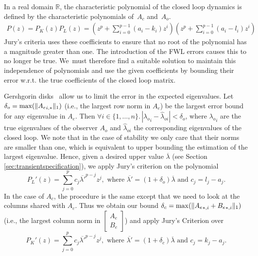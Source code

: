 \documentclass[sigconf]{llncs}
\DeclarePairedDelimiter\norm{\lVert}{\rVert}
\newcommand{\mat}[1]{{#1}}
\renewcommand{\note}[1]{\textcolor{red}{[#1]}}
\begin{document}
In a real domain $\mathbb{R}$, the characteristic polynomial of the closed
loop dynamics is defined by the characteristic polynomials of~$\mat{A}_c$
and~$\mat{A}_o$.
%
\begin{align*}
P(z)=P_K(z)P_L(z)=\left(z^p+\sum_{i=0}^{p-1}{(a_i-k_i)z^{i}}\right) \left(z^p+\sum_{i=0}^{p-1}{(a_i-l_i)z^{i}}\right)
\end{align*}
%
Jury's criteria uses these coefficients to ensure that no root of the
polynomial has a magnitude greater than one.
%
%
The introduction of the FWL errors causes this to no longer be true. 
We~must therefore find a suitable solution to maintain this independence of
polynomials and use the given coefficients by bounding their error w.r.t. 
the true coefficients of the closed loop matrix.

Gershgorin disks~\cite{van1996matrix} allow us to limit the error in the
expected eigenvalues.  Let $\delta_o=\max(\norm{{\mat{A}_e}_{i,*}}_1)$
(i.e., the largest row norm in $\mat{A}_e$) be the largest error bound
for any eigenvalue in $\mat{A}_e$.  Then $\forall i \in \{1, \ldots,n\}.\,
|{\lambda_o}_{i}-\hat{\lambda}_{oi}|<\delta_o$, where ${\lambda_o}_{i}$ are
the true eigenvalues of the observer $\mat{A}_o$ and $\hat{\lambda}_{oi}$
the corresponding eigenvalues of the closed loop.  We note that in the case
of stability we only care that their norms are smaller than one, which is
equivalent to upper bounding the estimation of the largest eigenvalue. 
Hence, given a desired upper value $\overline{\lambda}$ (see Section
\ref{sec:transientspecification}), we apply Jury's criterion on the
polynomial
%
\begin{equation}
P_L'(z)=\sum_{j=0}^p c_j\overline{\lambda'}^{p-j}z^j, \text{ where }  \overline{\lambda'}=(1+\delta_o)\overline{\lambda} \text{ and } c_j=l_j-a_j.
\end{equation}
%
In the case of $\mat{A}_c$, the procedure is the same except that we need to
look at the columns shared with $\mat{A}_c$.  Thus we obtain our bound
$\delta_c=\max(\norm{{\mat{A}_e}_{*,i}+{\mat{B}_e}_{*,i}}_1)$ (i.e.,
the largest column norm in $ \left[\begin{array}{c}\mat{A}_e\\
\mat{B}_e\end{array}\right]$) and apply Jury's Criterion over
%
\begin{equation}
P_K'(z)=\sum_{j=0}^p c_j\overline{\lambda'}^{p-j}z^j, \text{ where }  \overline{\lambda'}=(1+\delta_c)\overline{\lambda} \text{ and } c_j=k_j-a_j.
\end{equation}
\end{document}
